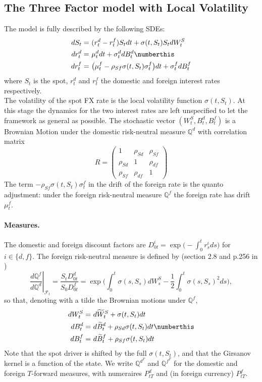 \subsection{The Three Factor model with Local Volatility }
The model is fully described by the following SDEs:
\begin{align*}
 dS_t   = &\ (r^d_t - r^f_t)S_t dt + \sigma(t,S_t)S_tdW^S_t \\
 dr_t^d  = &\  \mu^d_t dt + \sigma_t^d dB_t^d \numberthis \label{eq: threeFactorModel}\\
 dr_t^f  = & \ \big(\mu^f_t - \rho_{Sf}\sigma(t,S_t)\sigma_t^f \big)dt + \sigma_t^f dB_t^f
\end{align*}
where $S_t$ is the spot, $r_t^d$ and $r_t^f$ the domestic and foreign interest rates respectively.\\
The volatility of the spot FX rate is the local volatility function $\sigma(t,S_t)$.
At this stage the dynamics for the two interest rates are left unspecified to let the framework as general as possible. The stochastic vector $(W^S_t, B_t^d, B_t^f)$ is a Brownian Motion under the domestic risk-neutral measure $\mathbb{Q}^d$ with correlation matrix
\[R=\left( \begin{array}{ccc}
1 & \rho_{Sd} & \rho_{Sf} \\
\rho_{Sd} & 1 & \rho_{df} \\
\rho_{Sf} & \rho_{df} & 1 \end{array} \right)\]
The term $-\rho_{Sf}\sigma(t,S_t)\sigma^f_t$ in the drift of the foreign rate is the quanto adjustment: under the foreign risk-neutral measure $\mathbb{Q}^f$ the foreign rate has drift $\mu^f_t$.

\paragraph{Measures.} The domestic and foreign discount factors are $ D_{0t}^i=\exp\big(-\int_0^t r_s^ids\big)$ for $i\in\{d,f\}$. The foreign risk-neutral measure is defined by (section 2.8 and p.256 in \cite{clark})
\begin{equation}\label{eq: RNforeign}
\left.\frac{d\mathbb{Q}^f}{d\mathbb{Q}^d}\right|_{\mathcal{F}_t}=\frac{S_tD^d_{0t}}{S_0D^f_{0t}}
=\exp\bigg( \int_0^t\sigma(s,S_s) dW^S_s - \frac{1}{2}\int_0^t\sigma(s,S_s)^2 ds\bigg),
\end{equation}
so that, denoting with a tilde the Brownian motions under $\mathbb{Q}^f$,
\begin{align*}
dW^S_t = &\ d\widetilde{W}^{S}_t + \sigma(t,S_t)dt \\
dB^d_t = &\ d\widetilde{B}^{d}_t + \rho_{Sd}\sigma(t,S_t)dt  \numberthis \label{measureChange: domesticToForeign}\\
dB^f_t = &\ d\widetilde{B}^{f}_t + \rho_{Sf}\sigma(t,S_t)dt
\end{align*}
Note that the spot driver is shifted by the full $\sigma(t,S_t)$, and that the Girsanov kernel is a function of the state. We write $\mathbb{Q}^{d^T}$ and $\mathbb{Q}^{f^T}$ for the domestic and foreign $T$-forward measures, with numeraires $P^d_{tT}$ and (in foreign currency) $P^f_{tT}$.

